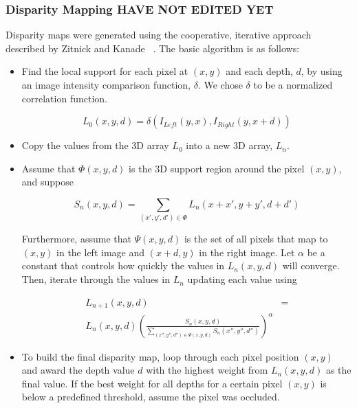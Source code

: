 \documentclass[twocolumn]{article}
\begin{document}
\subsubsection{Disparity Mapping HAVE NOT EDITED YET}
\label{subsec:disparity_mapping}

Disparity maps were generated using the cooperative, iterative approach described by Zitnick and Kanade ~\cite{stereo:zitKan}.
The basic algorithm is as follows:
\begin{itemize}
\item Find the local support for each pixel at $(x,y)$ and each depth, $d$, by using an image intensity comparison function, $\delta$.
We chose $\delta$ to be a normalized correlation function.

\begin{equation}
L_0(x,y,d) = \delta(I_{Left}(y,x),I_{Right}(y,x+d))
\end{equation}

\item Copy the values from the 3D array $L_0$ into a new 3D array, $L_n$.

\item Assume that $\Phi(x,y,d)$ is the 3D support region around the pixel $(x,y)$, and suppose

\begin{equation}
S_n(x,y,d) = \sum_{(x',y',d') \in \Phi} L_n (x+x', y+y', d+d')
\end{equation}

Furthermore, assume that $\Psi(x,y,d)$ is the set of all pixels that map to $(x,y)$ in the left image and $(x+d,y)$ in the right image. 
Let $\alpha$ be a constant that controls how quickly the values in $L_n(x,y,d)$ will converge. Then, iterate through the values in $L_n$ updating each value using
 
\begin{align}
L_{n+1}(x,y,d) &= \\ 
L_n(x,y,d)\left(\frac{S_n(x,y,d)}{\sum\limits_{(x'',y'',d'') \in \Psi(x,y,d)} S_n(x'',y'',d'')} \right)^\alpha 
\end{align}

\item To build the final disparity map, loop through each pixel position $(x,y)$ and award the depth value $d$ with the highest weight from $L_n(x,y,d)$ as the final value.
If the best weight for all depths for a certain pixel $(x,y)$ is below a predefined threshold, assume the pixel was occluded.
\end{itemize}
\end{document}
